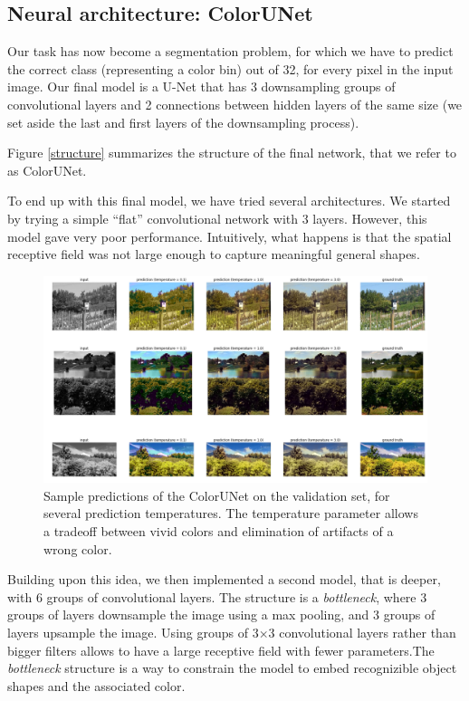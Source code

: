 \documentclass[10pt,twocolumn,letterpaper]{article}
\begin{document}
\subsection{Neural architecture: ColorUNet}

Our task has now become a segmentation problem, for which we have to predict the correct class (representing a color bin) out of 32, for every pixel in the input image. Our final model is a U-Net that has 3 downsampling groups of convolutional layers and 2 connections between hidden layers of the same size (we set aside the last and first layers of the downsampling process).

Figure \ref{structure} summarizes the structure of the final network, that we refer to as ColorUNet.

To end up with this final model, we have tried several architectures. We started by trying a simple ``flat'' convolutional network with 3 layers. However, this model gave very poor performance. Intuitively, what happens is that the spatial receptive field was not large enough to capture meaningful general shapes.
\begin{figure}
\begin{center}
\includegraphics[width=450px]{good}
\caption{Sample predictions of the ColorUNet on the validation set, for several prediction temperatures. The temperature parameter allows a tradeoff between vivid colors and elimination of artifacts of a wrong color.}
\label{good}
\end{center}
\end{figure}
Building upon this idea, we then implemented a second model, that is deeper, with 6 groups of convolutional layers. The structure is a \textit{bottleneck}, where 3 groups of layers downsample the image using a max pooling, and 3 groups of layers upsample the image. Using groups of 3$\times$3 convolutional layers rather than bigger filters allows to have a large receptive field with fewer parameters.The \textit{bottleneck} structure is a way to constrain the model to embed recognizible object shapes and the associated color.
\end{document}
